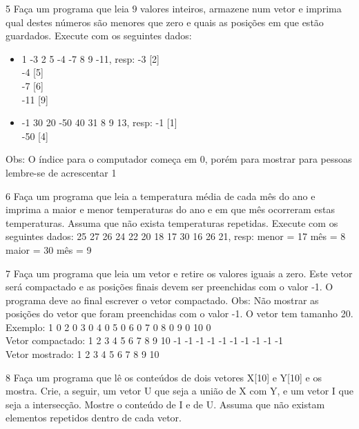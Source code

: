 \begin{exercicio}
  {5}
  {Faça um programa que leia $9$ valores inteiros, armazene num vetor e imprima qual destes números são menores que zero e quais as posições em que estão guardados.}
  Execute com os seguintes dados:
  \begin{itemize}
    \item 1 -3 2 5 -4 -7 8 9 -11, resp: -3 [2] \\
                                        -4 [5] \\
                                        -7 [6] \\
                                        -11 [9] 
    \item -1 30 20 -50 40 31 8 9 13, resp: -1 [1] \\
                                           -50 [4]
  \end{itemize}
  Obs: O índice para o computador começa em 0, porém para mostrar para pessoas lembre-se de acrescentar 1
\end{exercicio}

\begin{exercicio}
  {6}
  {Faça um programa que leia a temperatura média de cada mês do ano e imprima a maior e menor temperaturas do ano e em que mês ocorreram estas temperaturas. Assuma que não exista temperaturas repetidas.}
  Execute com os seguintes dados:
  25 27 26 24 22 20 18 17 30 16 26 21, resp: menor = 17 mês = 8 \\
                                             maior = 30 mês = 9
\end{exercicio}

\begin{exercicio}
  {7}
  {Faça um programa que leia um vetor e retire os valores iguais a zero. Este vetor será compactado e as posições finais devem ser preenchidas com o valor -1. O programa deve ao final escrever o vetor compactado.}
  Obs: Não mostrar as posições do vetor que foram preenchidas com o valor -1. O vetor tem tamanho 20.
  Exemplo: 1 0 2 0 3 0 4 0 5 0 6 0 7 0 8 0 9 0 10 0 \\
  Vetor compactado: 1 2 3 4 5 6 7 8 9 10 -1 -1 -1 -1 -1 -1 -1 -1 -1 -1 \\
  Vetor mostrado: 1 2 3 4 5 6 7 8 9 10
\end{exercicio}

\begin{exercicio}
  {8}
  {Faça um programa que lê os conteúdos de dois vetores X[10] e Y[10] e os mostra. Crie, a seguir, um vetor U que seja a união de X com Y, e um vetor I que seja a intersecção. Mostre o conteúdo de I e de U. Assuma que não existam elementos repetidos dentro de cada vetor.}
\end{exercicio}

